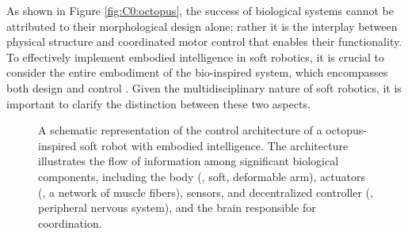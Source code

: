 As shown in Figure \ref{fig:C0:octopus}, the success of biological systems cannot be attributed to their morphological design alone; rather it is the interplay between physical structure and coordinated motor control that enables their functionality.
To effectively implement embodied intelligence in soft robotics, it is crucial to consider the entire embodiment of the bio-inspired system, which encompasses both design and control \cite{Rus2015,Hawkes2017}. Given the multidisciplinary nature of soft robotics, it is important to clarify the distinction between these two aspects.


\begin{figure}
  \centering
  
  \caption{\small A schematic representation of the control architecture of a octopus-inspired soft robot with embodied intelligence. The architecture illustrates the flow of information among significant biological components, including the body (\eg, soft, deformable arm), actuators (\eg, a network of muscle fibers), sensors, and decentralized controller (\ie, peripheral nervous system), and the brain responsible for coordination. \label{fig:C0:biometic} }
  \vspace{-3mm}
\end{figure}

